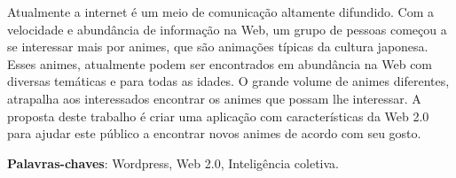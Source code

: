 \documentclass[
	12pt,				%
	openright,			%
	twoside,			%
	a4paper,			%
	Times,
	brazil,				%
	]{abntex2}
\begin{document}
%
%


















\setlength{\absparsep}{18pt} %
\begin{resumo}
	Atualmente a internet é um meio de comunicação altamente difundido. Com a velocidade e abundância de informação na Web, um grupo de pessoas começou a se interessar mais por animes, que são animações típicas da cultura japonesa. Esses animes, atualmente podem ser encontrados em abundância na Web com diversas temáticas e para todas as idades. O grande volume de animes diferentes, atrapalha aos interessados encontrar os animes que possam lhe interessar. A proposta deste trabalho é criar uma aplicação com características da Web 2.0 para ajudar este público a  encontrar novos animes de acordo com seu gosto.
	\par
	\textbf{Palavras-chaves}: Wordpress, Web 2.0, Inteligência coletiva.
\end{resumo}
\end{document}
